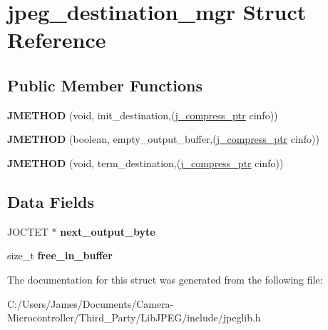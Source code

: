 \hypertarget{structjpeg__destination__mgr}{}\section{jpeg\+\_\+destination\+\_\+mgr Struct Reference}
\label{structjpeg__destination__mgr}
\subsection*{Public Member Functions}
\begin{DoxyCompactItemize}
\item 
\mbox{\label{structjpeg__destination__mgr_a4c57ceb96ea276d2138463dcd6853834}} 
{\bfseries J\+M\+E\+T\+H\+OD} (void, init\+\_\+destination,(\hyperlink{structjpeg__compress__struct}{j\+\_\+compress\+\_\+ptr} cinfo))
\item 
\mbox{\label{structjpeg__destination__mgr_a24a1fb7dfdadc591c99d87eda5d99fe7}} 
{\bfseries J\+M\+E\+T\+H\+OD} (boolean, empty\+\_\+output\+\_\+buffer,(\hyperlink{structjpeg__compress__struct}{j\+\_\+compress\+\_\+ptr} cinfo))
\item 
\mbox{\label{structjpeg__destination__mgr_a5badea9a0805f150134eb99361abc3c5}} 
{\bfseries J\+M\+E\+T\+H\+OD} (void, term\+\_\+destination,(\hyperlink{structjpeg__compress__struct}{j\+\_\+compress\+\_\+ptr} cinfo))
\end{DoxyCompactItemize}
\subsection*{Data Fields}
\begin{DoxyCompactItemize}
\item 
\mbox{\label{structjpeg__destination__mgr_a3c91b5250e09dfa65e63ab97d6fdd6ce}} 
J\+O\+C\+T\+ET $\ast$ {\bfseries next\+\_\+output\+\_\+byte}
\item 
\mbox{\label{structjpeg__destination__mgr_a84932d2a2b96ee83f5d2e9608b5fd83a}} 
size\+\_\+t {\bfseries free\+\_\+in\+\_\+buffer}
\end{DoxyCompactItemize}


The documentation for this struct was generated from the following file\+:\begin{DoxyCompactItemize}
\item 
C\+:/\+Users/\+James/\+Documents/\+Camera-\/\+Microcontroller/\+Third\+\_\+\+Party/\+Lib\+J\+P\+E\+G/include/jpeglib.\+h\end{DoxyCompactItemize}
